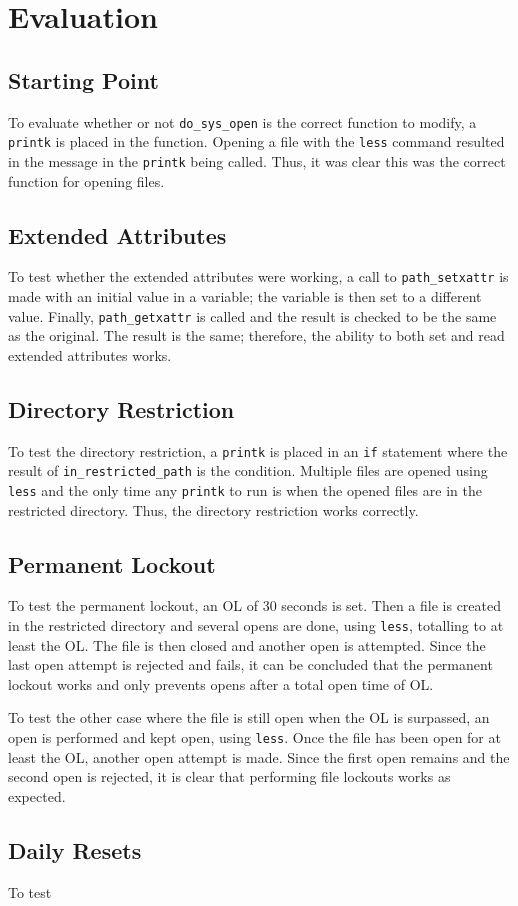 \section{Evaluation}

\subsection{Starting Point}

To evaluate whether or not \texttt{do\_sys\_open} is the correct function to modify, a \texttt{printk} is placed in the function. Opening a file with the \texttt{less} command resulted in the message in the \texttt{printk} being called. Thus, it was clear this was the correct function for opening files.

\subsection{Extended Attributes}

To test whether the extended attributes were working, a call to \texttt{path\_setxattr} is made with an initial value in a variable; the variable is then set to a different value. Finally, \texttt{path\_getxattr} is called and the result is checked to be the same as the original. The result is the same; therefore, the ability to both set and read extended attributes works.

\subsection{Directory Restriction}

To test the directory restriction, a \texttt{printk} is placed in an \texttt{if} statement where the result of \texttt{in\_restricted\_path} is the condition. Multiple files are opened using \texttt{less} and the only time any \texttt{printk} to run is when the opened files are in the restricted directory. Thus, the directory restriction works correctly.

\subsection{Permanent Lockout}

To test the permanent lockout, an OL of 30 seconds is set. Then a file is created in the restricted directory and several opens are done, using \texttt{less}, totalling to at least the OL. The file is then closed and another open is attempted. Since the last open attempt is rejected and fails, it can be concluded that the permanent lockout works and only prevents opens after a total open time of OL.

To test the other case where the file is still open when the OL is surpassed, an open is performed and kept open, using \texttt{less}. Once the file has been open for at least the OL, another open attempt is made. Since the first open remains and the second open is rejected, it is clear that performing file lockouts works as expected.

\subsection{Daily Resets}

To test 